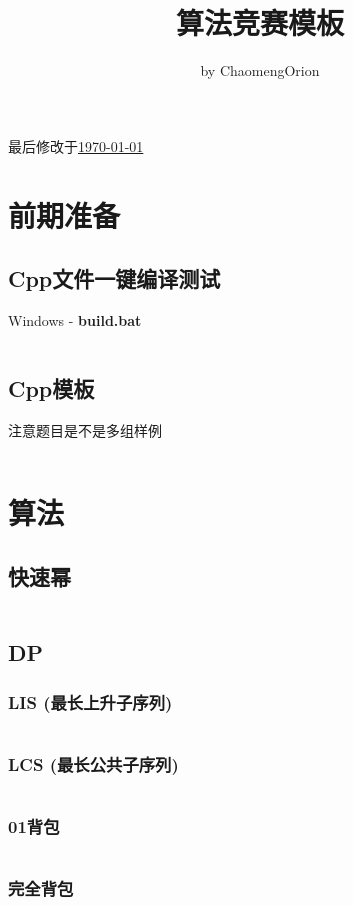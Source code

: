 \documentclass[a4paper, 10pt]{paper}
\newcommand{\cpp}[1]{\inputminted[frame=single, linenos=true]{cpp}{#1}}
\begin{document}
    \title{算法竞赛模板}
    \author{by ChaomengOrion}
    \maketitle
    {\color{cyan}最后修改于\underline{\today}}

    \tableofcontents

    \section{前期准备}
        \subsection{Cpp文件一键编译测试}
        Windows - \textbf{build.bat}
        \inputminted[frame=single, linenos=true]{bat}{../build.bat}

        \subsection{Cpp模板}
        注意题目是不是多组样例
        \cpp{../template_offline.cpp}

    \section{算法}
        \subsection{快速幂}
        \cpp{../快速幂.cpp}

        \subsection{DP}
        \subsubsection{LIS (最长上升子序列)}
        \cpp{../LIS.cpp}
        \subsubsection{LCS (最长公共子序列)}
        \cpp{../LCS.cpp}
        \subsubsection{01背包}
        \cpp{../0_1_背包.cpp}
        \subsubsection{完全背包}
        \cpp{../完全背包.cpp}
\end{document}
